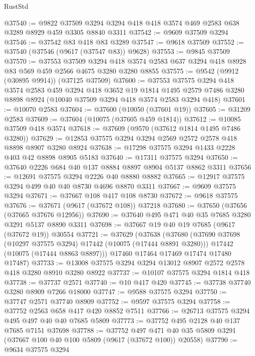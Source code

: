 \begin{lexlean}{RustStd}
\begin{coremodule}
@37540 := @9822
    @37509
    @3294
    @3294
    @418
    @418
    @3574
    @469
    @2583
    @638
    @3289
    @8929
    @459
    @3305
    @8840
    @3311
@37542 := @9609 @37509 @3294
@37546 := @37542 @83 @418 @83 @3289
@37547 := @9618 @37509
@37552 := @37540 (@37546 (@9617 (@37547 @83)) @9628)
@37553 := @9845 @37509
@37570 := @37553
    @37509
    @3294
    @418
    @3574
    @2583
    @637
    @3294
    @418
    @8928
    @83
    @569
    @459
    @2566
    @4675
    @3280
    @3280
    @8855
@37575 := @9542 (@9912 (@30895 @9914)) (@37125 @37509)
@37600 := @37553
    @37575
    @3294
    @418
    @3574
    @2583
    @459
    @3294
    @418
    @3652
    @19
    @1814
    @1495
    @2579
    @7486
    @3280
    @8898
    @8924
    (@10040 @37509 @3294 @418 @3574 @2583 @3294 @418)
@37601 := @10070 @2583
@37604 := @37600 (@10050 (@37601 @19))
@37605 := @31209 @2583
@37609 := @37604 (@10075 (@37605 @459 @1814))
@37612 := @10085 @37509 @418 @3574
@37618 := @37609 (@9570 (@37612 @1814 @1495 @7486 @3280))
@37629 := @12853 @37575 @3294 @3294 @2569 @2572 @2578 @418 @8898 @8907 @3280 @8924
@37638 := @17298 @37575 @3294 @1433 @2228 @403 @42 @8898 @8905 @5183
@37640 := @17311 @37575 @3294
@37650 := @37640 @2226 @684 @40 @137 @8884 @8897 @8904 @5137 @8862 @3311
@37656 := @12691 @37575 @3294 @2226 @40 @8880 @8882
@37665 := @12917 @37575 @3294 @499 @40 @40 @8730 @4696 @8870 @3311
@37667 := @9609 @37575 @3294
@37671 := @37667 @108 @417 @108 @8730
@37672 := @9618 @37575
@37676 := @37671 (@9617 (@37672 @108)) @37218
@37680 := @37650 (@37656 (@37665 @37676 @12956))
@37690 := @37640 @495 @471 @40 @35 @7685 @3280 @3291 @5137 @8890 @3311
@37698 := @37667 @19 @40 @19 @7685 (@9617 (@37672 @19)) @30554
@37721 := @37629
    (@37638
      (@37680
        (@37690 @37698 (@10297 @37575 @3294) @17442 (@10075 (@17444 @8891 @3280)))
        @17442
        (@10075 (@17444 @8863 @8897)))
      @17460
      @17464
      @17469
      @17474
      @17480
      @17487)
@37733 := @13008 @37575 @3294 @3294 @13012 @8907 @2572 @2578 @418 @3280 @8910 @3280 @8922
@37737 := @10107 @37575 @3294 @1814 @418
@37738 := @37737 @2571
@37740 := @10 @417 @420
@37745 := @37738 @37740 @3280 @8909 @7266 @18000
@37747 := @9588 @37575 @3294
@37750 := @37747 @2571 @37740 @8909
@37752 := @9597 @37575 @3294
@37758 := @37752 @2563 @658 @417 @420 @8852 @7511
@37766 := @26713 @37575 @3294 @495 @497 @40 @40 @7685 @5809
@37773 := @37752 @495 @2128 @40 @137 @7685 @7151 @37698
@37788 := @37752
    @497
    @471
    @40
    @35
    @5809
    @3291
    (@37667 @100 @40 @100 @5809 (@9617 (@37672 @100)) @20558)
@37790 := @9634 @37575 @3294

\end{coremodule}
\end{lexlean}
